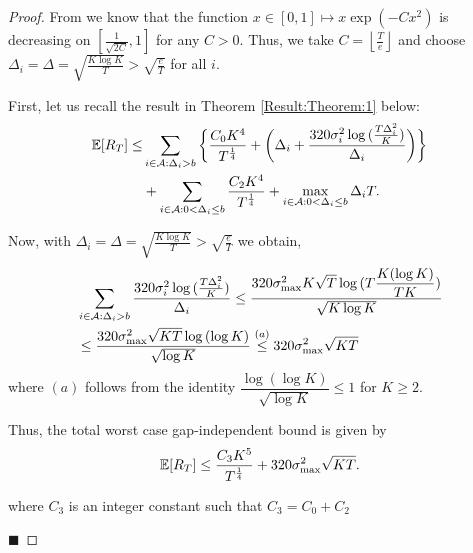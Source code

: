 \begin{proof}
\label{Proof:Corollary:1}
From \cite{bubeck2011pure}  we know that the function $x\in [0,1]\mapsto x\exp(-Cx^2)$ is  decreasing on $\left[\frac{1}{\sqrt{2C}},1\right ]$ for any $C>0$. Thus, we take $C=\left\lfloor \frac{T}{e}\right\rfloor$ and choose  $\Delta_{i}=\Delta=\sqrt{\frac{K\log K}{T}}>\sqrt{\frac{e}{T}}$ for all $i$.

First, let us recall the result in Theorem \ref{Result:Theorem:1} below:
\begin{align*}
\mathbb{E} [R_{T}] \leq &\sum\limits_{i\in \mathcal{A} :\Delta_{i} > b}\bigg\lbrace \dfrac{C_0 K^{4}}{T^{\frac{1}{4}}} + \bigg(\Delta_{i}+\dfrac{320\sigma_i^2\log{(\frac{T\Delta_{i}^{2}}{K})}}{\Delta_{i}}\bigg)\bigg \rbrace\\ 
  & +\sum\limits_{i\in \mathcal{A} :0 < \Delta_{i}\leq b} \dfrac{C_2 K^{4}}{T^{\frac{1}{4}}} + \max_{i\in \mathcal{A} :0 < \Delta_{i}\leq b}\Delta_{i}T.
\end{align*}

Now,  with  $\Delta_i =\Delta = \sqrt{\frac{K\log K}{T}}>\sqrt{\frac{e}{T}}$ we obtain,
	\begin{align*}
	&\sum_{i\in \mathcal{A} :\Delta_{i} > b}\dfrac{320\sigma_i^2\log{(\frac{T\Delta_{i}^{2}}{K})}}{\Delta_{i}} \leq  \dfrac{320\sigma_{\max}^2 K\sqrt{T}\log{(T\dfrac{K(\log K)}{T K})}}{\sqrt{K\log K}}\\ 
	&\leq  \dfrac{320\sigma_{\max}^2\sqrt{KT}\log{(\log K)}}{\sqrt{\log K}}
	\overset{(a)}{\leq} 320\sigma_{\max}^2\sqrt{KT} 
	\end{align*}		
	where $(a)$ follows from the identity $\dfrac{\log{(\log K)}}{\sqrt{\log K}}\leq 1$ for $K\geq 2$. 
	
%	

Thus, the total worst case gap-independent bound is given by
	\begin{align*}
	\mathbb{E}[R_{T}]\leq  \dfrac{C_3 K^5}{T^{\frac{1}{4}}} + 320\sigma_{\max}^2\sqrt{KT}.
	\end{align*}	
	
where $C_3$ is an integer constant such that $C_3 = C_0 + C_2 $

\hfill $\blacksquare$	
\end{proof}